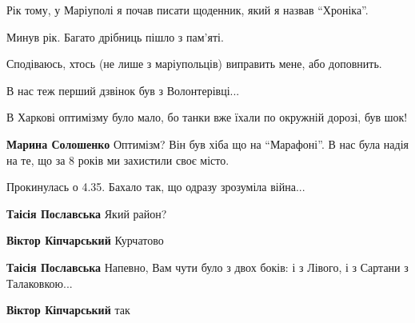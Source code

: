  
 
 
 
 

\qqSecCmt


Рік тому, у Маріуполі я почав писати щоденник, який я назвав \enquote{Хроніка}.

Минув рік. Багато дрібниць пішло з пам'яті.

Сподіваюсь, хтось (не лише з маріупольців) виправить мене, або доповнить.


В нас теж перший дзвінок був з Волонтерівці...


В Харкові оптимізму було мало, бо танки вже їхали по окружній дорозі, був шок!

\begin{itemize} %
\textbf{Марина Солошенко} Оптимізм?
Він був хіба що на \enquote{Марафоні}.
В нас була надія на те, що за 8 років ми захистили своє місто.
\end{itemize} %


Прокинулась о 4.35. Бахало так, що одразу зрозуміла війна...

\begin{itemize} %
\textbf{Таісія Пославська} Який район?

\textbf{Віктор Кіпчарський} Курчатово

\textbf{Таісія Пославська} Напевно, Вам чути було з двох боків: і з Лівого, і з Сартани з Талаковкою...

\textbf{Віктор Кіпчарський} так
\end{itemize} %
